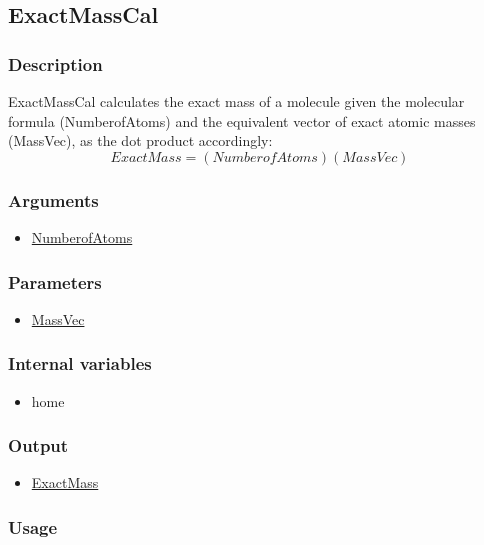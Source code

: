 \subsection{ExactMassCal}\label{ExactMassCal}
\subsubsection{Description}
ExactMassCal calculates the exact mass of a molecule given the molecular formula (NumberofAtoms) and the equivalent vector of exact atomic masses (MassVec), as the dot product accordingly:
\begin{equation}
ExactMass=\left(NumberofAtoms\right)\left(MassVec\right)
\end{equation}

\subsubsection{Arguments}
\begin{itemize}
\item \hyperref[NumberofAtoms]{NumberofAtoms}
\end{itemize}

\subsubsection{Parameters}
\begin{itemize}
\item \hyperref[MassVec]{MassVec}
\end{itemize}
\subsubsection{Internal variables}
\begin{itemize}
\item home
\end{itemize}
\subsubsection{Output}
\begin{itemize}
\item \hyperref[ExactMass]{ExactMass}
\end{itemize}

\subsubsection{Usage}




